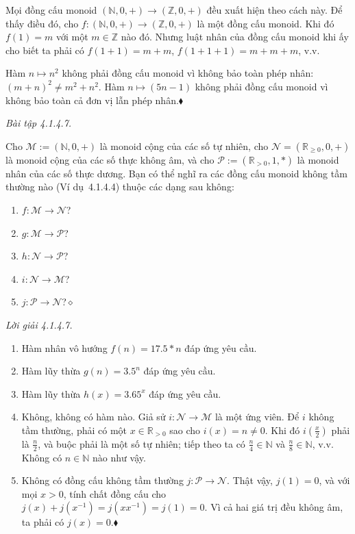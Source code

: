 Mọi đồng cấu monoid $(\mathbb{N},0,+)\to(\mathbb{Z},0,+)$ đều xuất hiện theo cách này. Để thấy điều đó, cho $f:(\mathbb{N},0,+)\to(\mathbb{Z},0,+)$ là một đồng cấu monoid. Khi đó $f(1)=m$ với một $m\in\mathbb{Z}$ nào đó. Nhưng luật nhân của đồng cấu monoid khi ấy cho biết ta phải có $f(1+1)=m+m$, $f(1+1+1)=m+m+m$, v.v.

Hàm $n\mapsto n^2$ không phải đồng cấu monoid vì không bảo toàn phép nhân: $(m+n)^2\ne m^2+n^2$. Hàm $n\mapsto(5n-1)$ không phải đồng cấu monoid vì không bảo toàn cả đơn vị lẫn phép nhân.\hfill$\blacklozenge$

\noindent\textit{Bài tập 4.1.4.7.}\keepwithnext

Cho $\mathcal{M}:=(\mathbb{N},0,+)$ là monoid cộng của các số tự nhiên, cho $\mathcal{N}=(\mathbb{R}_{\ge0},0,+)$ là monoid cộng của các số thực không âm, và cho $\mathcal{P}:=(\mathbb{R}_{>0},1,*)$ là monoid nhân của các số thực dương. Bạn có thể nghĩ ra các đồng cấu monoid không tầm thường nào (Ví dụ~4.1.4.4) thuộc các dạng sau không:
\begin{enumerate}[label=\alph*.]
\item $f:\mathcal{M}\to\mathcal{N}$?
\item $g:\mathcal{M}\to\mathcal{P}$?
\item $h:\mathcal{N}\to\mathcal{P}$?
\item $i:\mathcal{N}\to\mathcal{M}$?
\item $j:\mathcal{P}\to\mathcal{N}$?\nobreak\hfill$\diamond$
\end{enumerate}

\noindent\textit{Lời giải 4.1.4.7.}\keepwithnext
\begin{enumerate}[label=\alph*.]
\item Hàm nhân vô hướng $f(n)=17.5*n$ đáp ứng yêu cầu.
\item Hàm lũy thừa $g(n)=3.5^n$ đáp ứng yêu cầu.
\item Hàm lũy thừa $h(x)=3.65^x$ đáp ứng yêu cầu.
\item Không, không có hàm nào. Giả sử $i:\mathcal{N}\to\mathcal{M}$ là một ứng viên. Để $i$ không tầm thường, phải có một $x\in\mathbb{R}_{>0}$ sao cho $i(x)=n\ne0$. Khi đó $i(\tfrac{x}{2})$ phải là $\tfrac n2$, và buộc phải là một số tự nhiên; tiếp theo ta có $\tfrac n4\in\mathbb{N}$ và $\tfrac n8\in\mathbb{N}$, v.v. Không có $n\in\mathbb{N}$ nào như vậy.
\item Không có đồng cấu không tầm thường $j:\mathcal{P}\to\mathcal{N}$. Thật vậy, $j(1)=0$, và với mọi $x>0$, tính chất đồng cấu cho $j(x)+j(x^{-1})=j(xx^{-1})=j(1)=0$. Vì cả hai giá trị đều không âm, ta phải có $j(x)=0$.\nobreak\hfill$\blacklozenge$
\end{enumerate}

